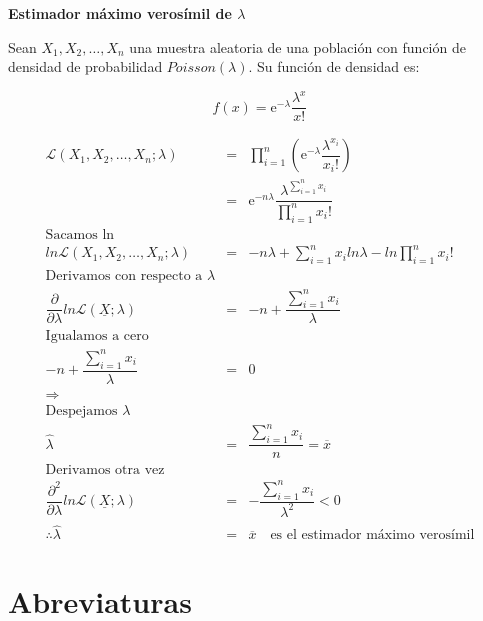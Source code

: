 \begin{defn} \label{EMVlambda}
\textbf{Estimador máximo verosímil de $\lambda$}

Sean $X_{1}, X_{2}, \ldots, X_{n}$ una muestra aleatoria de una población con función de densidad de probabilidad $Poisson(\lambda)$. Su función de densidad es:

\begin{equation}
f(x) = \mathrm{e}^{-\lambda} \dfrac{\lambda^{x}}{x!}
\end{equation}

\begin{eqnarray*}
\mathcal{L}(X_{1}, X_{2},\ldots, X_{n}; \lambda) &=& \displaystyle \prod_{i = 1}^{n} \left( \mathrm{e}^{-\lambda} \dfrac{\lambda^{x_{i}}}{x_{i}!} \right)\\
												 &=& \mathrm{e}^{-n \lambda} \dfrac{\lambda^{\displaystyle \sum_{i = 1}^{n} x_{i}}}{\displaystyle  \prod_{i = 1}^{n} x_{i}!}\\
\text{Sacamos ln}\\
ln \mathcal{L}(X_{1}, X_{2}, \ldots, X_{n};\lambda) &=& -n\lambda + \displaystyle \sum_{i = 1}^{n} x_{i} ln \lambda - ln \displaystyle  \prod_{i = 1}^{n} x_{i}! \\
\text{Derivamos con respecto a } \lambda\\
\dfrac{\partial}{\partial \lambda} ln \mathcal{L}(\underline{X};\lambda) &=& -n + \dfrac{\displaystyle \sum_{i = 1}^{n} x_{i}}{\lambda} \\
\text{Igualamos a cero}\\
-n + \dfrac{\displaystyle \sum_{i = 1}^{n} x_{i}}{\lambda} &=& 0 \\
\Rightarrow\\
\text{Despejamos } \lambda\\
\hat{\lambda} &=& \dfrac{\displaystyle \sum_{i = 1}^{n} x_{i}}{n} = \overline{x}\\
\text{Derivamos otra vez}\\
\dfrac{\partial^{2}}{\partial \lambda} ln \mathcal{L}(\underline{X};\lambda)  &=& - \dfrac{\displaystyle \sum_{i = 1}^{n} x_{i}}{\lambda^{2}} < 0\\
\therefore \hat{\lambda} &=& \overline{x} \,\,\,\,\,\, \text{es el estimador máximo verosímil}
\end{eqnarray*}
\end{defn}







\section{Abreviaturas} %
%
%
%
%


